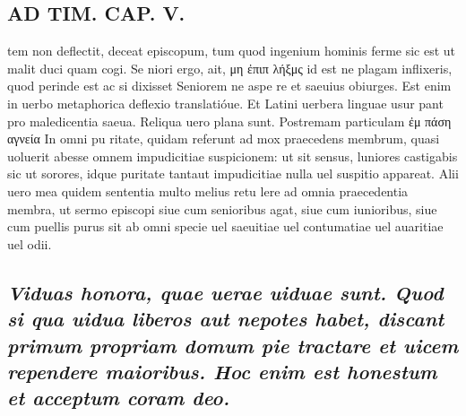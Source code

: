 \documentclass{article}
\begin{document}
\begin{pages}
\section*{AD TIM. CAP. V. }
\marginpar{[ p.148 ]}\pstart tem non deflectit, deceat episcopum, tum quod ingenium hominis ferme sic est ut malit duci quam cogi. Se niori ergo, ait, μη ἐπιπ λήξμς id est ne plagam inflixeris, quod perinde est ac si dixisset Seniorem ne aspe re et saeuius obiurges. Est enim in uerbo metaphorica deflexio translatióue. Et Latini uerbera linguae usur pant pro maledicentia saeua. Reliqua uero plana sunt. Postremam particulam ἐμ πάση αγνεία In omni pu ritate, quidam referunt ad mox praecedens membrum, quasi uoluerit abesse omnem impudicitiae suspicionem: ut sit sensus, luniores castigabis sic ut sorores, idque puritate tantaut impudicitiae nulla uel suspitio appareat. Alii uero mea quidem sententia multo melius retu lere ad omnia praecedentia membra, ut sermo episcopi siue cum senioribus agat, siue cum iunioribus, siue cum puellis purus sit ab omni specie uel saeuitiae uel contumatiae uel auaritiae uel odii.  \pend
{}
{}
\subsection*{\textit{Viduas honora, quae uerae uiduae sunt. Quod si qua uidua liberos aut nepotes habet, discant primum propriam domum pie tractare et uicem rependere maioribus. Hoc enim est honestum et acceptum coram deo. }}

\end{pages}
\end{document}

